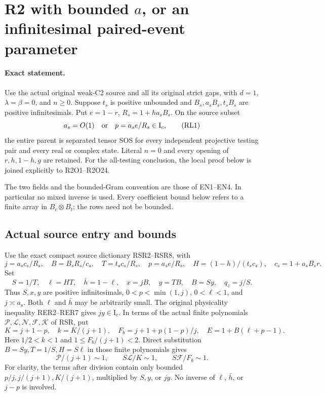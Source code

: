 \section{R2 with bounded \(a\), or an infinitesimal paired-event parameter}
\label{sec:r2-shifted-local}

\paragraph{Exact statement.}
Use the actual original weak-C2 source and all its original strict
gaps, with \(d=1\), \(\lambda=\beta=0\), and \(n\geq0\).
Suppose \(t_s\) is positive unbounded and
\(B_s,a_sB_s,t_sB_s\) are positive infinitesimals.
Put \(e=1-r\), \(R_s=1+ha_sB_s\).  On the source subset
\[
       a_s=O(1)\quad\hbox{or}\quad
       p=a_s e/R_s\in\mathrm I_c,                     \tag{RL1}
\]
the entire parent is separated tensor SOS for every independent
projective testing pair and every real or complex state.
Literal \(n=0\) and every opening of \(r,h,1-h,g\) are retained.
For the all-testing conclusion, the local proof below is joined
explicitly to R2O1--R2O24.

The two fields and the bounded-Gram convention are those of EN1--EN4.
In particular no mixed inverse is used.  Every coefficient bound
below refers to a finite array in \(B_c\otimes B_t\); the rows need
not be bounded.

\subsection{Actual source entry and bounds}

Use the exact compact source dictionary RSR2--RSR8, with
\[
 j=a_sc_s/R_s,\quad B=B_sR_s/c_s,\quad T=t_sc_s/R_s,\quad
 p=a_se/R_s,\quad H=(1-h)/(t_sc_s),\quad c_s=1+a_sB_sr.
\]
Set
\[
 S=1/T,\quad \ell=HT,\quad \bar h=1-\ell,\quad
 x=jB,\quad y=TB,\quad B=Sy,\quad q_z=j/S .
                                                               \tag{RL2}
\]
Thus \(S,x,y\) are positive infinitesimals,
\(0<p<\min(1,j)\), \(0<\ell<1\), and \(j\asymp a_s\).
Both \(\ell\) and \(\bar h\) may be arbitrarily small.
The original physicality inequality RER2--RER7 gives \(jy\in\mathrm I_c\).
In terms of the actual finite polynomials \(\mathcal P,\mathcal L,
\mathcal N,\mathcal F,\mathcal K\) of RSR, put
\[
 K=j+1-p,\quad k=K/(j+1),\quad
 F_b=j+1+p(1-p)/j,\quad E=1+B(\ell+p-1).
                                                               \tag{RL3}
\]
Here \(1/2<k<1\) and \(1\le F_b/(j+1)<2\).  Direct substitution
\(B=Sy,T=1/S,H=S\ell\) in those finite polynomials gives
\[
 \mathcal P/(j+1)\sim1,\qquad
 S\mathcal L/K\sim1,\qquad S\mathcal F/F_b\sim1.         \tag{RL4}
\]
For clarity, the terms after division contain only bounded
\(p/j,j/(j+1),K/(j+1)\), multiplied by \(S,y\), or \(jy\).
No inverse of \(\ell\), \(\bar h\), or \(j-p\) is involved.

